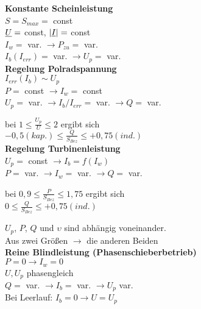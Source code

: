 \textbf{Konstante Scheinleistung}\\
\indent $S = S_{max} =$ const\\
\indent $\underline{U}=$ const, $|\underline{I}| =$ const\\
\indent $I_w =$ var. $\rightarrow P_{zu}=$ var.\\
\indent $I_b(I_{err}) =$ var. $\rightarrow U_p =$ var.\\

\textbf{Regelung Polradspannung}\\
\indent $I_{err}(I_b) \sim U_p$ \\
\indent $P =$ const $\rightarrow I_w= $ const\\
\indent $U_p =$ var. $\rightarrow I_b/I_{err} = $ var. $\rightarrow Q=$ var.

\indent bei $1 \leq \frac{U_p}{U} \leq 2$ ergibt sich \\
\indent $-0,5 (kap.) \leq \frac{Q}{S_{Bez}} \leq +0,75(ind.)$\\

\textbf{Regelung Turbinenleistung}\\
\indent $U_p =$ const $\rightarrow I_b = f(I_w)$\\
\indent $P =$ var. $\rightarrow I_w= $ var. $\rightarrow Q =$ var.

\indent bei $0,9 \leq \frac{P}{S_{Bez}} \leq 1,75$ ergibt sich\\
\indent $0 \leq \frac{Q}{S_{Bez}} \leq +0,75(ind.)$

$U_p$, $ P$, $Q$ und $\upsilon$ sind abhängig voneinander. \\
Aus zwei Größen $\rightarrow$ die anderen Beiden\\

\textbf{Reine Blindleistung (Phasenschieberbetrieb)}\\
\indent $P = 0 \rightarrow I_w= 0$ \\
$U, U_p$ phasengleich\\
\indent $Q =$ var. $\rightarrow I_b = $ var. $\rightarrow U_p$ var.\\
Bei Leerlauf: $I_b = 0 \rightarrow U = U_p$
